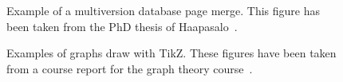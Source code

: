 


\begin{figure}[ht]
  \begin{center}
    
    \caption{Example of a multiversion database page merge. This figure has
    been taken from the PhD thesis of Haapasalo~\citep{HaapasaloThesis}.}
    \label{fig:page-merge}
  \end{center}
\end{figure}


\newlength{\graphdotsize}
\setlength{\graphdotsize}{1.7pt}
\newlength{\graphgridsize}
\setlength{\graphgridsize}{1.2em}
\begin{figure}[ht]
\begin{center}
\caption{Examples of graphs draw with TikZ. These figures have been taken from a
course report for the graph theory course~\citep{FerryProblem}.}
\label{fig:tikz-examples}
\end{center}
\end{figure}

